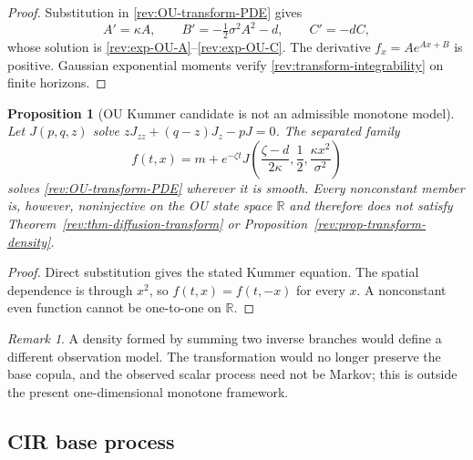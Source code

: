 \documentclass[11pt]{article}
\newtheorem{proposition}[definition]{Proposition}
\theoremstyle{remark}
\newtheorem{remark}[definition]{Remark}
\newcommand{\R}{\mathbb R}
\begin{document}
\begin{proof}
Substitution in \eqref{rev:OU-transform-PDE} gives
\[
A'=\kappa A,\qquad B'=-\tfrac12\sigma^2A^2-d,
\qquad C'=-dC,
\]
whose solution is \eqref{rev:exp-OU-A}--\eqref{rev:exp-OU-C}.  The derivative
$f_x=Ae^{Ax+B}$ is positive.  Gaussian exponential moments verify
\eqref{rev:transform-integrability} on finite horizons.
\end{proof}

\begin{proposition}[OU Kummer candidate is not an admissible monotone model]
\label{rev:prop-OU-Kummer-failure}
Let $J(p,q,z)$ solve
$zJ_{zz}+(q-z)J_z-pJ=0$.  The separated family
\begin{equation}
f(t,x)=m+e^{-\zeta t}
J\!\left(\frac{\zeta-d}{2\kappa},\frac12,
         \frac{\kappa x^2}{\sigma^2}\right)
\label{rev:OU-Kummer}
\end{equation}
solves \eqref{rev:OU-transform-PDE} wherever it is smooth.  Every nonconstant
member is, however, noninjective on the OU state space $\R$ and therefore does
not satisfy Theorem~\ref{rev:thm-diffusion-transform} or
Proposition~\ref{rev:prop-transform-density}.
\end{proposition}

\begin{proof}
Direct substitution gives the stated Kummer equation.  The spatial dependence
is through $x^2$, so $f(t,x)=f(t,-x)$ for every $x$.  A nonconstant even function
cannot be one-to-one on $\R$.
\end{proof}

\begin{remark}
A density formed by summing two inverse branches would define a different
observation model.  The transformation would no longer preserve the base
copula, and the observed scalar process need not be Markov; this is outside the
present one-dimensional monotone framework.
\end{remark}

\subsection{CIR base process}
\end{document}
